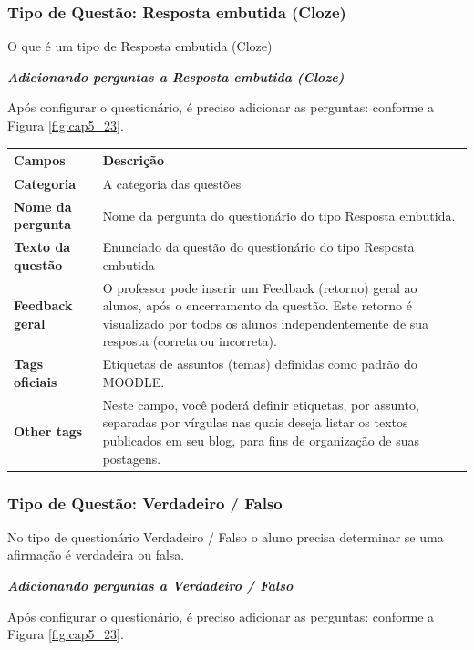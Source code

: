 \subsubsection{Tipo de Questão: Resposta embutida (Cloze)}

O que é um tipo de Resposta embutida (Cloze)

 \textit{\textbf{Adicionando perguntas a Resposta embutida (Cloze)}}

Após configurar o questionário, é preciso adicionar as perguntas: conforme a Figura \ref{fig:cap5_23}.

\begin{longtable}{p{6cm}|p{9cm}}
     \hline
     \rowcolor[rgb]{0.8,0.8,0.8} \textbf{Campos} &  \textbf{Descrição}\\\hline
    \textbf{Categoria} & A categoria das questões \\\hline
    \textbf{Nome da pergunta} &Nome da pergunta do questionário do tipo Resposta embutida.\\\hline
    \textbf{Texto da questão} & Enunciado da questão do questionário do tipo Resposta embutida \\\hline
    \textbf{Feedback geral} & O professor pode inserir um Feedback (retorno)  geral  ao
alunos,  após o encerramento da questão. Este retorno é visualizado por todos os alunos independentemente de sua resposta (correta ou incorreta).
 \\\hline
    \textbf{Tags oficiais} & Etiquetas de assuntos (temas) definidas como padrão do MOODLE. \\\hline
    \textbf{Other tags} & Neste campo,  você poderá definir  etiquetas,  por assunto, separadas por vírgulas nas quais deseja listar os textos publicados em seu blog, para fins de organização de suas postagens. \\\hline
\end{longtable}%


\subsubsection{Tipo de Questão: Verdadeiro / Falso}

No tipo de questionário Verdadeiro / Falso o aluno precisa determinar se uma afirmação é verdadeira ou falsa.

 \textit{\textbf{Adicionando perguntas a Verdadeiro / Falso}}

Após configurar o questionário, é preciso adicionar as perguntas: conforme a Figura \ref{fig:cap5_23}.


